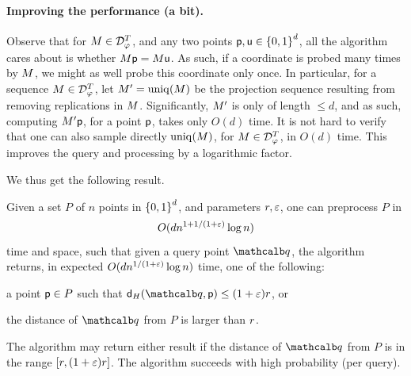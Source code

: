 \paragraph{Improving the performance (a bit).}

Observe that for ${M} \in \mathcal{D}_{\varphi}^T$, and any two points
$\mathsf{p}, \mathsf{u} \in \left\{ {0,1} \right\}^d$, all the algorithm cares about is
whether ${M} \mathsf{p} = {M} \mathsf{u}$. As such, if a coordinate is probed
many times by ${M}$, we might as well probe this coordinate only
once. In particular, for a sequence ${M} \in \mathcal{D}_{\varphi}^T$,
let $\seq' = \uniqX{\seq}$ be the projection sequence resulting from
removing replications in ${M}$. Significantly, ${M}'$ is only of
length $\leq d$, and as such, computing ${M}' \mathsf{p}$, for a point
$\mathsf{p}$, takes only $O(d)$ time. It is not hard to verify that one can
also sample directly $\uniqX{\seq}$, for
${M} \in \mathcal{D}_{\varphi}^T$, in $O(d)$ time. This improves the
query and processing by a logarithmic factor.




\bigskip

We thus get the following result.

\begin{theorem}
    Given a set $P$ of $n$ points in $\left\{ {0,1} \right\}^d$, and parameters
    $r, {\varepsilon}$, one can preprocess $P$ in
    \begin{equation*}
        O( d n^{1+1/(1+{\varepsilon})} \log n)
    \end{equation*}
    time and space, such that given a query point $\query$, the
    algorithm returns, in expected $O( d n^{1/(1+{\varepsilon})} \log n)$ time,
    one of the following: \smallskip%
    \begin{compactenumA}
        \item a point $\mathsf{p} \in P$ such that
        $\distH{\query}{\pnt} \leq (1+\eps)\rad$, or

        \smallskip%
        \item the distance of $\query$ from $P$ is larger than $r$.
    \end{compactenumA}
    \smallskip%
    The algorithm may return either result if the distance of $\query$
    from $P$ is in the range $[r,(1+{\varepsilon})r]$. The algorithm succeeds
    with high probability (per query).
\end{theorem}

